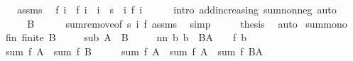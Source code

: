 \begin{isabellebody}
%
\isadelimproof
%
\endisadelimproof
%
\isatagproof
{}\isamarkupfalse%
\ {\isacharminus}{\kern0pt}\isanewline
\ \ \isamarkupfalse%
\ assms\ \isamarkupfalse%
\ {\isachardoublequoteopen}f\ i\ {\isasymle}\ f\ i\ {\isacharplus}{\kern0pt}\ {\isacharparenleft}{\kern0pt}{\isasymSum}i\ {\isasymin}\ s\ {\isacharminus}{\kern0pt}\ {\isacharbraceleft}{\kern0pt}i{\isacharbraceright}{\kern0pt}{\isachardot}{\kern0pt}\ f\ i{\isacharparenright}{\kern0pt}{\isachardoublequoteclose}\isanewline
\ \ \ \ \isamarkupfalse%
\ {\isacharparenleft}{\kern0pt}intro\ add{\isacharunderscore}{\kern0pt}increasing{}\ sum{\isacharunderscore}{\kern0pt}nonneg{\isacharparenright}{\kern0pt}\ auto\isanewline
\ \ \isamarkupfalse%
\ \isamarkupfalse%
\ {\isachardoublequoteopen}{\isasymdots}\ {\isacharequal}{\kern0pt}\ B{\isachardoublequoteclose}\isanewline
\ \ \ \ \isamarkupfalse%
\ sum{\isachardot}{\kern0pt}remove{\isacharbrackleft}{\kern0pt}of\ s\ i\ f{\isacharbrackright}{\kern0pt}\ assms\ \isamarkupfalse%
\ simp\isanewline
\ \ \isamarkupfalse%
\ \isamarkupfalse%
\ {\isacharquery}{\kern0pt}thesis\ \isamarkupfalse%
\ auto\isanewline
{}\isamarkupfalse%
%
\endisatagproof
{\isafoldproof}%
%
\isadelimproof
\isanewline
%
\endisadelimproof
\isanewline
{}\isamarkupfalse%
\ sum{\isacharunderscore}{\kern0pt}mono{}{\isacharcolon}{\kern0pt}\isanewline
\ \ \ fin{\isacharcolon}{\kern0pt}\ {\isachardoublequoteopen}finite\ B{\isachardoublequoteclose}\isanewline
\ \ \ \ \ sub{\isacharcolon}{\kern0pt}\ {\isachardoublequoteopen}A\ {\isasymsubseteq}\ B{\isachardoublequoteclose}\isanewline
\ \ \ \ \ nn{\isacharcolon}{\kern0pt}\ {\isachardoublequoteopen}{\isasymAnd}b{\isachardot}{\kern0pt}\ b\ {\isasymin}\ B{\isacharminus}{\kern0pt}A\ {\isasymLongrightarrow}\ {}\ {\isasymle}\ f\ b{\isachardoublequoteclose}\isanewline
\ \ \ {\isachardoublequoteopen}sum\ f\ A\ {\isasymle}\ sum\ f\ B{\isachardoublequoteclose}\isanewline
%
\isadelimproof
%
\endisadelimproof
%
\isatagproof
{}\isamarkupfalse%
\ {\isacharminus}{\kern0pt}\isanewline
\ \ \isamarkupfalse%
\ {\isachardoublequoteopen}sum\ f\ A\ {\isasymle}\ sum\ f\ A\ {\isacharplus}{\kern0pt}\ sum\ f\ {\isacharparenleft}{\kern0pt}B{\isacharminus}{\kern0pt}A{\isacharparenright}{\kern0pt}{\isachardoublequoteclose}\isanewline
\ \ \ \ \isamarkupfalse%

\end{isabellebody}
